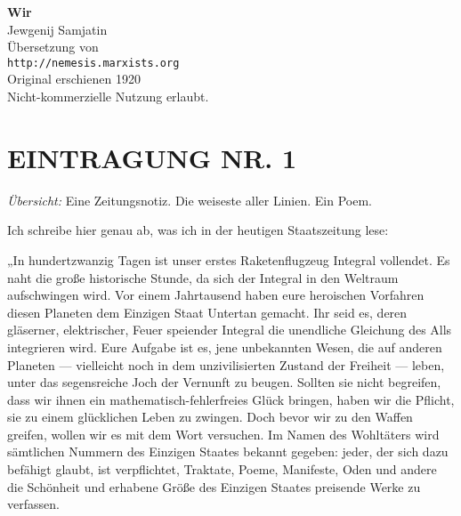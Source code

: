 \usepackage[ngerman]{babel}
\usepackage[T1]{fontenc}
\usepackage{textcomp}



\newcommand{\uebersicht}[1]{#1\medskip\par\noindent}
\newcommand\wurzel{$\sqrt{-1}$}
\newcommand\werk\textit
\newcommand\wort\textit
\newcommand\bigpar{\bigskip\noindent}

\newcommand\markup\textit

\newenvironment{meldung}{\itshape}{}
\newenvironment{brief}{\itshape}{}


\raggedbottom
\begin{center}
\textbf{\huge\textsf{Wir}}\\
\bigskip
{\large Jewgenij Samjatin}\\
\bigskip
Übersetzung von\\
\texttt{http://nemesis.marxists.org}\\
\bigskip
Original erschienen 1920\\
\bigskip
Nicht-kommerzielle Nutzung erlaubt.
\end{center}

\section{EINTRAGUNG NR. 1}

\uebersicht{\emph{Übersicht:} Eine Zeitungsnotiz. Die weiseste
aller Linien. Ein Poem.}
Ich schreibe hier genau ab, was ich in der heutigen Staatszeitung
lese:

„In hundertzwanzig Tagen ist unser erstes Raketenflugzeug Integral
vollendet. Es naht die große historische Stunde, da sich der
Integral in den Weltraum aufschwingen wird. Vor einem Jahrtausend
haben eure heroischen Vorfahren diesen Planeten dem Einzigen Staat
Untertan gemacht. Ihr seid es, deren gläserner, elektrischer, Feuer
speiender Integral die unendliche Gleichung des Alls integrieren
wird. Eure Aufgabe ist es, jene unbekannten Wesen, die auf anderen
Planeten — vielleicht noch in dem unzivilisierten Zustand der
Freiheit — leben, unter das segensreiche Joch der Vernunft zu
beugen. Sollten sie nicht begreifen, dass wir ihnen ein
mathematisch-fehlerfreies Glück bringen, haben wir die Pflicht, sie
zu einem glücklichen Leben zu zwingen. Doch bevor wir zu den Waffen
greifen, wollen wir es mit dem Wort versuchen. Im Namen des
Wohltäters wird sämtlichen Nummern des Einzigen Staates bekannt
gegeben: jeder, der sich dazu befähigt glaubt, ist verpflichtet,
Traktate, Poeme, Manifeste, Oden und andere die Schönheit und
erhabene Größe des Einzigen Staates preisende Werke zu verfassen.

